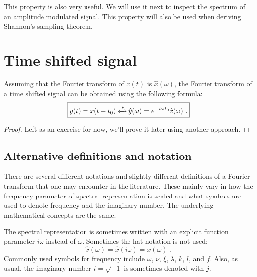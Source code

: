 This property is also very useful. We will use it next to inspect the spectrum of an amplitude modulated signal. This property will also be used when deriving Shannon's sampling theorem.

\section{Time shifted signal}
Assuming that the Fourier transform of $x(t)$ is $\hat{x}(\omega)$, the Fourier transform of a  time shifted signal can be obtained using the following formula:
\begin{equation}
\boxed{y(t) = x(t-t_0) \xleftrightarrow{\mathcal{F}} \hat{y}(\omega)= e^{-i\omega t_0}\hat{x}(\omega)\,\,.}
\label{eq:ft:timeshift}
\end{equation}
\begin{proof}
Left as an exercise for now, we'll prove it later using another approach. 
\end{proof}

\subsection{Alternative definitions and notation}
There are several different notations and slightly different definitions of a Fourier transform that one may encounter in the literature. These mainly vary in how the frequency parameter of spectral representation is scaled and what symbols are used to denote frequency and the imaginary number. The underlying mathematical concepts are the same. 

The spectral representation is sometimes written with an explicit function parameter $i\omega$ instead of $\omega$. Sometimes the hat-notation is not used:
\begin{equation}
\hat{x}(\omega) = \hat{x}(i\omega) = x(\omega)\,\,.
\end{equation}
Commonly used symbols for frequency include $\omega$, $\nu$, $\xi$, $\lambda$, $k$, $l$, and $f$. Also, as usual, the imaginary number $i=\sqrt{-1}$ is sometimes denoted with $j$.

